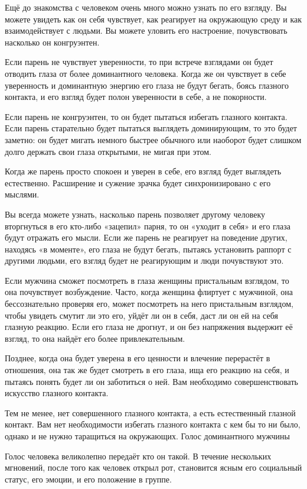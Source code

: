 Ещё до знакомства с человеком очень много можно узнать по его взгляду. Вы можете увидеть как он себя чувствует, как реагирует на окружающую среду и как взаимодействует с людьми. Вы можете уловить его настроение, почувствовать насколько он конгруэнтен.

Если парень не чувствует уверенности, то при встрече взглядами он будет отводить глаза от более доминантного человека. Когда же он чувствует в себе уверенность и доминантную энергию его глаза не будут бегать, боясь глазного контакта, и его взгляд будет полон уверенности в себе, а не покорности.

Если парень не конгруэнтен, то он будет пытаться избегать глазного контакта. Если парень старательно будет пытаться выглядеть доминирующим, то это будет заметно: он будет мигать немного быстрее обычного или наоборот будет слишком долго держать свои глаза открытыми, не мигая при этом.

Когда же парень просто спокоен и уверен в себе, его взгляд будет выглядеть естественно. Расширение и сужение зрачка будет синхронизировано с его мыслями.

Вы всегда можете узнать, насколько парень позволяет другому человеку вторгнуться в его кто-либо «зацепил» парня, то он «уходит в себя» и его глаза будут отражать его мысли. Если же парень не реагирует на поведение других, находясь «в моменте», его глаза не будут бегать, пытаясь установить раппорт с другими людьми, его взгляд будет не реагирующим и люди почувствуют это.

Если мужчина сможет посмотреть в глаза женщины пристальным взглядом, то она почувствует возбуждение. Часто, когда женщина флиртует с мужчиной, она бессознательно проверяя его, может посмотреть на него пристальным взглядом, чтобы увидеть смутит ли это его, уйдёт ли он в себя, даст ли он ей на себя глазную реакцию. Если его глаза не дрогнут, и он без напряжения выдержит её взгляд, то она найдёт его более привлекательным.

Позднее, когда она будет уверена в его ценности и влечение перерастёт в отношения, она так же будет смотреть в его глаза, ища его реакцию на себя, и пытаясь понять будет ли он заботиться о ней. Вам необходимо совершенствовать искусство глазного контакта.

Тем не менее, нет совершенного глазного контакта, а есть естественный глазной контакт. Вам нет необходимости избегать глазного контакта с кем бы то ни было, однако и не нужно таращиться на окружающих.
Голос доминантного мужчины

Голос человека великолепно передаёт кто он такой. В течение нескольких мгновений, после того как человек открыл рот, становится ясным его социальный статус, его эмоции, и его положение в группе.

